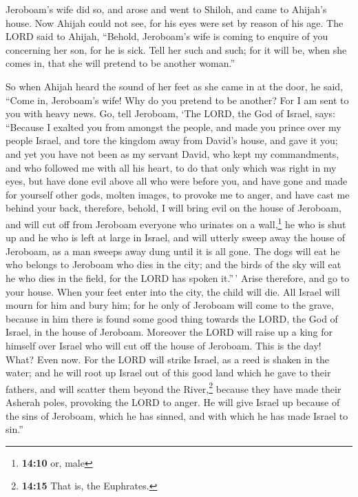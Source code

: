  Jeroboam's wife did so, and arose and went to Shiloh, and
came to Ahijah's house. Now Ahijah could not see, for his eyes were set
by reason of his age.  The LORD said to Ahijah, ``Behold,
Jeroboam's wife is coming to enquire of you concerning her son, for he
is sick. Tell her such and such; for it will be, when she comes in, that
she will pretend to be another woman.''

 So when Ahijah heard the sound of her feet as she came in
at the door, he said, ``Come in, Jeroboam's wife! Why do you pretend to
be another? For I am sent to you with heavy news.  Go,
tell Jeroboam, `The LORD, the God of Israel, says: ``Because I exalted
you from amongst the people, and made you prince over my people Israel,
 and tore the kingdom away from David's house, and gave it
you; and yet you have not been as my servant David, who kept my
commandments, and who followed me with all his heart, to do that only
which was right in my eyes,  but have done evil above all
who were before you, and have gone and made for yourself other gods,
molten images, to provoke me to anger, and have cast me behind your
back,  therefore, behold, I will bring evil on the house
of Jeroboam, and will cut off from Jeroboam everyone who urinates on a
wall,\footnote{\textbf{14:10} or, male} he who is shut up and he who is
left at large in Israel, and will utterly sweep away the house of
Jeroboam, as a man sweeps away dung until it is all gone.
 The dogs will eat he who belongs to Jeroboam who dies in
the city; and the birds of the sky will eat he who dies in the field,
for the LORD has spoken it.''\,'  Arise therefore, and go
to your house. When your feet enter into the city, the child will die.
 All Israel will mourn for him and bury him; for he only
of Jeroboam will come to the grave, because in him there is found some
good thing towards the LORD, the God of Israel, in the house of
Jeroboam.  Moreover the LORD will raise up a king for
himself over Israel who will cut off the house of Jeroboam. This is the
day! What? Even now.  For the LORD will strike Israel, as
a reed is shaken in the water; and he will root up Israel out of this
good land which he gave to their fathers, and will scatter them beyond
the River,\footnote{\textbf{14:15} That is, the Euphrates.} because they
have made their Asherah poles, provoking the LORD to anger.
 He will give Israel up because of the sins of Jeroboam,
which he has sinned, and with which he has made Israel to sin.''

